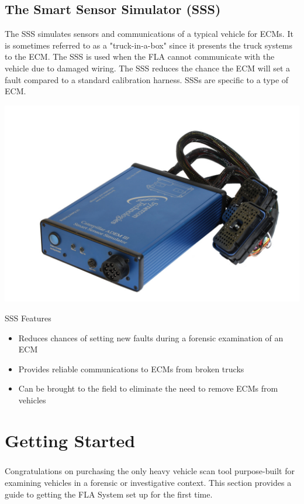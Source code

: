 \documentclass[11pt, oneside]{book}
\begin{document}
\section{The Smart Sensor Simulator (SSS)}
\vspace{1cm}
The SSS simulates sensors and communications of a typical vehicle for ECMs. It is sometimes referred to as a "truck-in-a-box" since it presents the truck systems to the ECM.
The SSS is used when the FLA cannot communicate with the vehicle due to damaged wiring. The SSS reduces the chance the ECM will set a fault compared to a standard calibration harness. SSSs are specific to a type of ECM.
\vspace{1cm}
\begin{center}
\includegraphics[width=.9\linewidth]{../media/sss/sss_solo}
\end{center}
\vspace{1cm}
SSS Features
\begin{itemize}
\item Reduces chances of setting new faults during a forensic examination of an ECM
\item Provides reliable communications to ECMs from broken trucks
\item Can be brought to the field to eliminate the need to remove ECMs from vehicles
\end{itemize}


\chapter{Getting Started}
\paragraph{  }
Congratulations on purchasing the only heavy vehicle scan tool purpose-built for examining vehicles in a forensic or investigative context. This section provides a guide to getting the FLA System set up for the first time.
\end{document}
